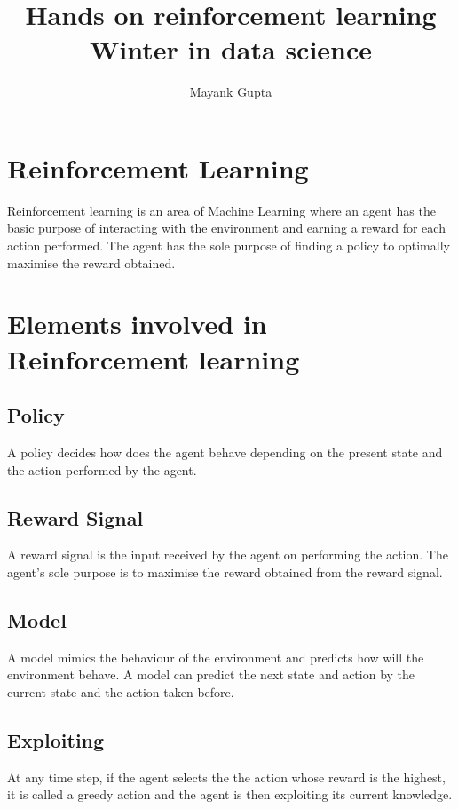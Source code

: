 \documentclass[12pt]{article}
\title{\textbf {Hands on reinforcement learning}\\
Winter in data science}
\author{Mayank Gupta}
\begin{document}
\maketitle

\section{Reinforcement Learning} %
Reinforcement learning is an area of Machine Learning where an agent has the basic purpose of interacting with the environment and earning a reward for each action performed. The agent has the sole purpose of finding a policy to optimally maximise the reward obtained.

\section{Elements involved in Reinforcement learning}%
\subsection{Policy}

A policy decides how does the agent behave depending on the present state and the action performed by the agent. 

\subsection{Reward Signal}
A reward signal is the input received by the agent on performing the action. The agent's sole purpose is to maximise the reward obtained from the reward signal.

\subsection{Model}
A model mimics the behaviour of the environment and predicts how will the environment behave. A model can predict the next state and action by the current state and the action taken before.

\subsection{Exploiting}
At any time step, if the agent selects the the action whose reward is the highest, it is called a greedy action and the agent is then exploiting its current knowledge.
\end{document}
